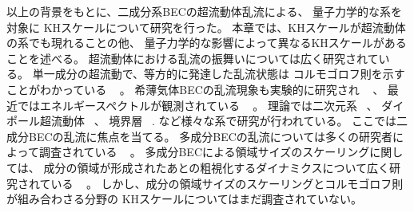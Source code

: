 \documentclass[12pt,a4paper]{jbook}
\begin{document}
        以上の背景をもとに、二成分系BECの超流動体乱流による、
        量子力学的な系を対象に
        KHスケールについて研究を行った。
        本章では、KHスケールが超流動体の系でも現れることの他、
        量子力学的な影響によって異なるKHスケールがあることを述べる。
        超流動体における乱流の振舞いについては広く研究されている。
        単一成分の超流動で、等方的に発達した乱流状態は
        コルモゴロフ則を示すことがわかっている
        ~\cite{Nore, Stalp, Araki, Kobayashi, Parker, Baggaley}
        。
        希薄気体BECの乱流現象も実験的に研究され
        ~\cite{Henn, Neely, Kwon}
        、
        最近ではエネルギースペクトルが観測されている
        ~\cite{Thompson, Navon, Johnstone, Navon2}
        。
        理論では二次元系
        ~\cite{Nazarenko, Horng, Numasato, Bradley, Reeves}、
        ダイポール超流動体
        ~\cite{Bland}、
        境界層
        ~\cite{Stagg}.
        など様々な系で研究が行われている。
        ここでは二成分BECの乱流に焦点を当てる。
        多成分BECの乱流については多くの研究者によって調査されている
        ~\cite{Berloff, Takeuchi, Fujimoto, Tsubota, Vill, Kobyakov, Kang}
        。
        多成分BECによる領域サイズのスケーリングに関しては、
        成分の領域が形成されたあとの粗視化するダイナミクスについて広く研究されている
        ~\cite{Karl, Kudo, Hofmann, De, Nicklas, Williamson, Bourges,
        Prufer, Fujimoto18, Takeuchi18, Symes}
        。
        しかし、成分の領域サイズのスケーリングとコルモゴロフ則が組み合わさる分野の
        KHスケールについてはまだ調査されていない。
\end{document}
